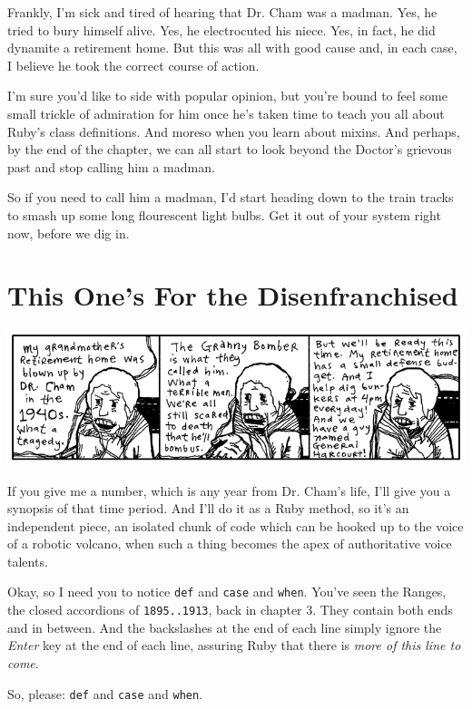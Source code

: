 \documentclass[10pt,twoside]{report}
\begin{document}
Frankly, I'm sick and tired of hearing that Dr. Cham was a madman.
Yes, he tried to bury himself alive.  Yes, he electrocuted his niece.
Yes, in fact, he did dynamite a retirement home.  But this was all
with good cause and, in each case, I believe he took the correct
course of action.

I'm sure you'd like to side with popular opinion, but you're bound to
feel some small trickle of admiration for him once he's taken time to
teach you all about Ruby's class definitions. And moreso when you
learn about mixins.  And perhaps, by the end of the chapter, we can
all start to look beyond the Doctor's grievous past and stop calling
him a madman.

So if you need to call him a madman, I'd start heading down to the
train tracks to smash up some long flourescent light bulbs.  Get it
out of your system right now, before we dig in.


\section{This One's For the Disenfranchised}


	\includegraphics[width=1.0\textwidth]{cache/33.png}

If you give me a number, which is any year from Dr. Cham's life, I'll
give you a synopsis of that time period.  And I'll do it as a Ruby
method, so it's an independent piece, an isolated chunk of code which
can be hooked up to the voice of a robotic volcano, when such a thing
becomes the apex of authoritative voice talents.

Okay, so I need you to notice \lstinline[breaklines=true]|def| and
\lstinline[breaklines=true]|case| and
\lstinline[breaklines=true]|when|.  You've seen the Ranges, the closed
accordions of \lstinline[breaklines=true]|1895..1913|, back in chapter
3.  They contain both ends and in between.  And the backslashes at the
end of each line simply ignore the {\em Enter} key at the end of each
line, assuring Ruby that there is {\em more of this line to come}.

So, please: \lstinline[breaklines=true]|def| and
\lstinline[breaklines=true]|case| and
\lstinline[breaklines=true]|when|.
\end{document}
